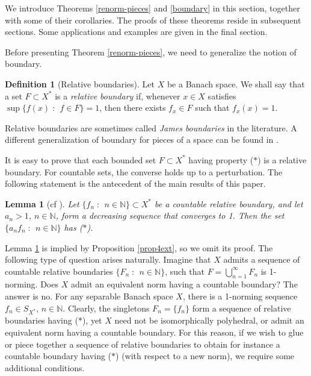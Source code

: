 \documentclass[12pt,a4paper]{amsart}
\newtheorem{lemma}[theorem]{Lemma}
\theoremstyle{definition}
\newtheorem{definition}[theorem]{Definition}
\theoremstyle{remark}
\newcommand{\N}{\mathbb{N}}
\newcommand{\set}[2]{\{{#1} \;:\;\, {#2}\}}
\newcommand{\st}{($*$)}
\begin{document}
%
We introduce Theorems \ref{renorm-pieces} and \ref{boundary} in this section,
together with some of their corollaries. The proofs of these theorems reside in
subsequent sections. Some applications and examples are given
in the final section.

Before presenting Theorem \ref{renorm-pieces}, we need to generalize the notion of boundary.

\begin{definition}[Relative boundaries]
Let $X$ be a Banach space.  We shall say that a set $F\subset X^{*}$ is a
{\em relative boundary} if, 
whenever $x\in X$ satisfies $\sup\set{f(x)}{f \in F} = 1$,
then there exists $f_x\in F$ such that $f_x(x) = 1$.
\end{definition}

Relative boundaries are sometimes called {\em James boundaries} in the
literature. A different generalization of boundary for pieces of a space
can be found in \cite{FL}.

It is easy to prove that each bounded set $F\subset X^*$ having property
{\st} is a relative boundary. For countable sets, the converse holds up to a
perturbation. The following statement is the antecedent of the main results of this paper.

\begin{lemma}[{cf \cite[Theorem 3]{fonf2}}]\label{lemma4}
Let $\set{f_n}{n\in \N} \subset X^*$ be a countable relative boundary, and
let $a_n > 1$, $n\in \N$, form a decreasing sequence that converges to 1. Then the set
$\set{a_n f_n}{n \in \N}$ has {\st}.
\end{lemma}

Lemma \ref{lemma4} is implied by Proposition \ref{prop4ext}, so we
omit its proof. The following type of question arises naturally. Imagine that
$X$ admits a sequence of countable relative boundaries $\set{F_n}{n\in \N}$,
such that $F= \bigcup_{n=1}^\infty F_n$ is 1-norming. Does $X$ admit
an equivalent norm having a countable boundary? The answer is no. For
any separable Banach space $X$, there is a 1-norming sequence $f_n\in S_{X^*}$,
$n \in \N$. Clearly, the singletons $F_n=\{f_n\}$ form a sequence of
relative boundaries having {\st}, yet $X$ need not be
isomorphically polyhedral, or admit an equivalent norm having a countable
boundary. For this reason, if we wish to glue or piece
together a sequence of relative boundaries to obtain for instance a countable boundary
having {\st} (with respect to a new norm), we require some additional conditions.
\end{document}
